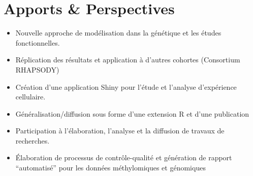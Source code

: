 \documentclass[10pt,  xcolors={RGB}, hyperref={%
    pdfpagelabels=false,
    colorlinks=true,
    pdftex=true,
    bookmarks=true,
    bookmarksopen=true,
    hyperfootnotes=true}]{beamer}
\begin{document}
\section{Apports \& Perspectives}
\begin{frame}{\secname}
\begin{itemize}
	\item<1-> Nouvelle approche de modélisation dans la génétique et les études fonctionnelles.
	\item<2->[$\Rightarrow$] Réplication des résultats et application à d'autres cohortes (Consortium RHAPSODY)\vspace{1.5em}
	\item<3-> Création d'une application Shiny pour l'étude et l'analyse d'expérience cellulaire.
	\item<4->[$\Rightarrow$] Généralisation/diffusion sous forme d'une extension R et d'une publication\vspace{1.5em}
	\item<5-> Participation à l'élaboration, l'analyse et la diffusion de travaux de recherches.
	\item<6->[$\Rightarrow$] \'Elaboration de processus de contrôle-qualité et génération de rapport ``automatisé'' pour les données méthylomiques et génomiques
\end{itemize}
\end{frame}
\note{}
\end{document}
